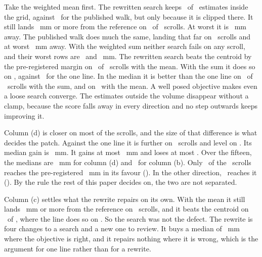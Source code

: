 Take the weighted mean first. The rewritten search keeps \RevAblCInside\ of \RevAblInsideOf\
estimates inside the grid, against \RevAblAInside\ for the published walk, but only because it is
clipped there. It still lands \RevTensMm~mm or more from the reference on \RevAblCTensOfMm\ of
\RevAblScrolls\ scrolls. At worst it is \RevAblCWorst~mm away. The published walk does much the
same, landing that far on \RevAblATensOfMm\ scrolls and at worst \RevAblAWorst~mm away. With the
weighted sum neither search fails on any scroll, and their worst rows are \RevAblBWorst\ and
\RevAblDWorst~mm. The rewritten search beats the centroid by the pre-registered margin on
\RevAblCBeatsCentroid\ of \RevAblScrolls\ scrolls with the mean. With the sum it does so on
\RevAblDBeatsCentroid, against \RevAblBBeatsCentroid\ for the one line. In the median it is better
than the one line on \RevAblDBetterThanB\ of \RevAblScrolls\ scrolls with the sum, and on
\RevAblCBetterThanB\ with the mean. A well posed objective makes even a loose search converge. The
estimates outside the volume disappear without a clamp, because the score falls away in every
direction and no step outwards keeps improving it.

Column (d) is closer on most of the scrolls, and the size of that difference is what decides the
patch. Against the one line it is further on \RevAblDWorseThanB\ scrolls and level on
\RevAblDEqualB. Its median gain is \RevAblDMedianGain~mm. It gains at most \RevAblDBestGain~mm and
loses at most \RevAblDWorstLoss. Over the fifteen, the medians are \RevAblDMedianOfScrolls~mm for
column (d) and \RevAblBMedianOfScrolls\ for column (b). Only \RevAblDOverThreshold\ of the
\RevAblScrolls\ scrolls reaches the pre-registered \UmbThresholdMm~mm in its favour
(\RevAblDOverThresholdScrolls). In the other direction, \RevAblBOverThreshold\ reaches it
(\RevAblBOverThresholdScrolls). By the rule the rest of this paper decides on, the two are not
separated.

Column (c) settles what the rewrite repairs on its own. With the mean it still lands \RevTensMm~mm
or more from the reference on \RevAblCTensOfMm\ scrolls, and it beats the centroid on
\RevAblCBeatsCentroid\ of \RevAblScrolls, where the line does so on \RevAblBBeatsCentroid. So the
search was not the defect. The rewrite is four changes to a search and a new one to review. It buys
a median of \RevAblDMedianGain~mm where the objective is right, and it repairs nothing where it is
wrong, which is the argument for one line rather than for a rewrite.

